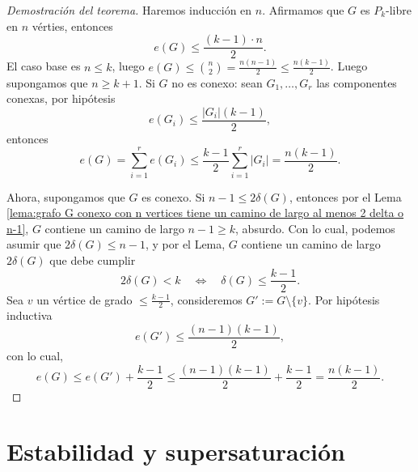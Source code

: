 \documentclass[12pt]{report}
\theoremstyle{plain}
\theoremstyle{definition}
\newcommand{\abs}[1]{\left \vert #1 \right \vert}
\begin{document}
\begin{proof}[Demostración del teorema]
Haremos inducción en $n$. Afirmamos que $G$ es $P_k$-libre en $n$ vérties, entonces
\[
    e(G) \leq \frac{(k-1)\cdot n}{2}.
\]
El caso base es $n \leq k$, luego $e(G) \leq \binom n 2 = \frac{n (n-1)}{2} \leq \frac{n (k-1)}{2}$. Luego supongamos que $n \geq k+1$. Si $G$ no es conexo: sean $G_1, \ldots, G_r$ las componentes conexas, por hipótesis
\[
    e(G_i) \leq \frac{\abs{G_i} (k-1)}{2},
\]
entonces
\[
    e(G) = \sum_{i = 1}^r e(G_i) \leq \frac{k-1}{2} \sum_{i =1}^r \abs {G_i} = \frac{n (k-1)}{2}.
\]

Ahora, supongamos que $G$ es conexo. Si $n-1 \leq 2 \delta (G)$, entonces por el Lema \ref{lema:grafo G conexo con n vertices tiene un camino de largo al menos 2 delta o n-1}, $G$ contiene un camino de largo $n-1 \geq k$, absurdo. Con lo cual, podemos asumir que $2 \delta (G) \leq n-1$, y por el Lema, $G$ contiene un camino de largo $2 \delta (G)$ que debe cumplir
\[
    2\delta (G) < k \quad \Leftrightarrow \quad \delta (G) \leq \frac{k-1}{2}.
\]
Sea $v$ un vértice de grado $\leq \frac{k-1}{2}$, consideremos $G' := G \setminus \{v\}$. Por hipótesis inductiva
\[
    e(G') \leq \frac{(n-1)(k-1)}{2},
\]
con lo cual,
\[
    e(G) \leq e(G') + \frac{k-1}{2} \leq \frac{(n-1)(k-1)}{2} + \frac{k-1}{2} = \frac{n(k-1)}{2}.
\]
\end{proof}



\section{Estabilidad y supersaturación}
\end{document}
